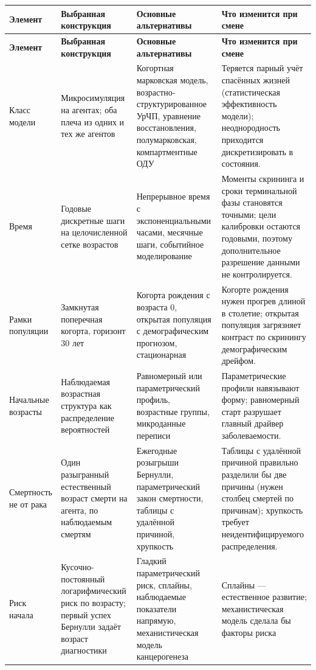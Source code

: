 \documentclass[12pt,a4paper]{article}
\begin{document}
{\footnotesize\setlength{\tabcolsep}{4pt}
\begin{longtable}{@{}p{2.3cm}p{4.5cm}p{4.0cm}p{4.0cm}@{}}
\toprule
\textbf{Элемент} & \textbf{Выбранная конструкция} & \textbf{Основные альтернативы} & \textbf{Что изменится при смене} \\
\midrule
\endfirsthead
\toprule
\textbf{Элемент} & \textbf{Выбранная конструкция} & \textbf{Основные альтернативы} & \textbf{Что изменится при смене} \\
\midrule
\endhead
\bottomrule
\endlastfoot
Класс модели & Микросимуляция на агентах; оба плеча из одних и тех же агентов & Когортная марковская модель,
возрастно-структурированное УрЧП, уравнение восстановления, полумарковская, компартментные ОДУ & Теряется
парный учёт спасённых жизней (статистическая эффективность модели); неоднородность приходится
дискретизировать в состояния. \\
Время & Годовые дискретные шаги на целочисленной сетке возрастов & Непрерывное время с экспоненциальными
часами, месячные шаги, событийное моделирование & Моменты скрининга и сроки терминальной фазы становятся
точными; цели калибровки остаются годовыми, поэтому дополнительное разрешение данными не контролируется. \\
Рамки популяции & Замкнутая поперечная когорта, горизонт 30 лет & Когорта рождения с возраста 0, открытая
популяция с демографическим прогнозом, стационарная & Когорте рождения нужен прогрев длиной в столетие;
открытая популяция загрязняет контраст по скринингу демографическим дрейфом. \\
Начальные возрасты & Наблюдаемая возрастная структура как распределение вероятностей & Равномерный или
параметрический профиль, возрастные группы, микроданные переписи & Параметрические профили навязывают форму;
равномерный старт разрушает главный драйвер заболеваемости. \\
Смертность не от рака & Один разыгранный естественный возраст смерти на агента, по наблюдаемым смертям &
Ежегодные розыгрыши Бернулли, параметрический закон смертности, таблицы с удалённой причиной, хрупкость &
Таблицы с удалённой причиной правильно разделили бы две причины (нужен столбец смертей по причинам);
хрупкость требует неидентифицируемого распределения. \\
Риск начала & Кусочно-постоянный логарифмический риск по возрасту; первый успех Бернулли задаёт возраст
диагностики & Гладкий параметрический риск, сплайны, наблюдаемые показатели напрямую, механистическая модель
канцерогенеза & Сплайны --- естественное развитие; механистическая модель сделала бы факторы риска

\end{longtable}}
\end{document}
